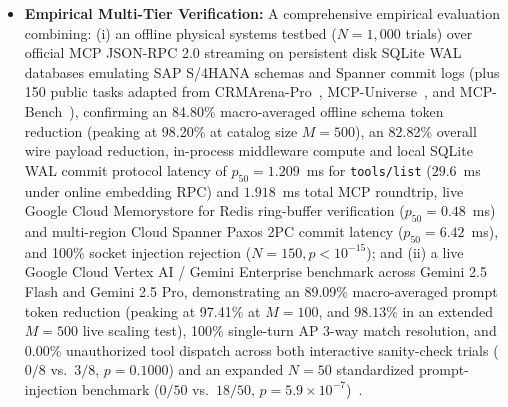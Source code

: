 \documentclass[conference,10pt]{IEEEtran}
\begin{document}
\begin{itemize}
    \item \textbf{Empirical Multi-Tier Verification:} A comprehensive empirical evaluation combining: (i) an offline physical systems testbed ($N = 1{,}000$ trials) over official MCP JSON-RPC 2.0 streaming on persistent disk SQLite WAL databases emulating SAP S/4HANA schemas and Spanner commit logs (plus 150 public tasks adapted from CRMArena-Pro~\cite{huang2025crmarena}, MCP-Universe~\cite{luo2025mcpuniverse}, and MCP-Bench~\cite{wang2025mcpbench}), confirming an 84.80\% macro-averaged offline schema token reduction (peaking at 98.20\% at catalog size $M = 500$), an 82.82\% overall wire payload reduction, in-process middleware compute and local SQLite WAL commit protocol latency of $p_{50} = 1.209$~ms for \texttt{tools/list} ($29.6$~ms under online embedding RPC) and $1.918$~ms total MCP roundtrip, live Google Cloud Memorystore for Redis ring-buffer verification ($p_{50} = 0.48$~ms) and multi-region Cloud Spanner Paxos 2PC commit latency ($p_{50} = 6.42$~ms), and 100\% socket injection rejection ($N = 150, p < 10^{-15}$); and (ii) a live Google Cloud Vertex AI / Gemini Enterprise benchmark across Gemini 2.5 Flash and Gemini 2.5 Pro, demonstrating an 89.09\% macro-averaged prompt token reduction (peaking at 97.41\% at $M = 100$, and $98.13\%$ in an extended $M = 500$ live scaling test), 100\% single-turn AP 3-way match resolution, and 0.00\% unauthorized tool dispatch across both interactive sanity-check trials ($0/8$ vs.\ $3/8$, $p = 0.1000$) and an expanded $N = 50$ standardized prompt-injection benchmark ($0/50$ vs.\ $18/50$, $p = 5.9 \times 10^{-7}$)~\cite{zhan2024injecagent, debenedetti2024agentdojo, zhang2025asb}.
\end{itemize}
\end{document}
